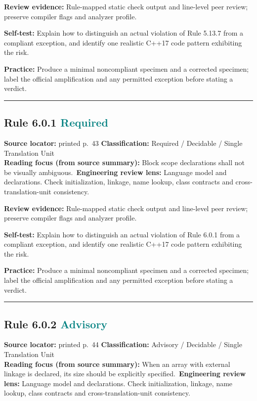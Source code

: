 \documentclass[10pt,letterpaper]{article}
\begin{document}
\textbf{Review evidence:} Rule-mapped static check output and line-level peer review; preserve compiler flags and analyzer profile.

\textbf{Self-test:} Explain how to distinguish an actual violation of Rule 5.13.7 from a compliant exception, and identify one realistic C++17 code pattern exhibiting the risk.\par
\textbf{Practice:} Produce a minimal noncompliant specimen and a corrected specimen; label the official amplification and any permitted exception before stating a verdict.
\smallskip\hrule\smallskip
\subsection*{Rule 6.0.1 \enspace \texorpdfstring{\small\textcolor{teal}{Required}}{Required}}
\noindent\textbf{Source locator:} printed p.~43 \quad\textbf{Classification:} Required / Decidable / Single Translation Unit\\
\textbf{Reading focus (from source summary):} Block scope declarations shall not be visually ambiguous.\
\textbf{Engineering review lens:} Language model and declarations. Check initialization, linkage, name lookup, class contracts and cross-translation-unit consistency.

\textbf{Review evidence:} Rule-mapped static check output and line-level peer review; preserve compiler flags and analyzer profile.

\textbf{Self-test:} Explain how to distinguish an actual violation of Rule 6.0.1 from a compliant exception, and identify one realistic C++17 code pattern exhibiting the risk.\par
\textbf{Practice:} Produce a minimal noncompliant specimen and a corrected specimen; label the official amplification and any permitted exception before stating a verdict.
\smallskip\hrule\smallskip
\subsection*{Rule 6.0.2 \enspace \texorpdfstring{\small\textcolor{teal}{Advisory}}{Advisory}}
\noindent\textbf{Source locator:} printed p.~44 \quad\textbf{Classification:} Advisory / Decidable / Single Translation Unit\\
\textbf{Reading focus (from source summary):} When an array with external linkage is declared, its size should be explicitly specified.\
\textbf{Engineering review lens:} Language model and declarations. Check initialization, linkage, name lookup, class contracts and cross-translation-unit consistency.
\end{document}
